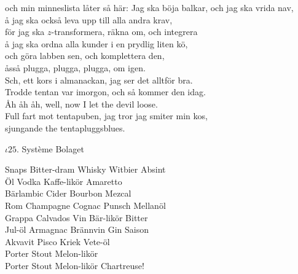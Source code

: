 \documentclass[a6paper, 10pt, twoside]{article}
\begin{document}
\begin{lyrics}
och min minneslista låter så här:
\newpage
\noindent
Jag ska böja balkar, och jag ska vrida nav, \\
å jag ska också leva upp till alla andra krav, \\
för jag ska $z$-transformera, räkna om, och integrera \\
å jag ska ordna alla kunder i en prydlig liten kö, \\
och göra labben sen, och komplettera den, \\
åsså plugga, plugga, plugga, om igen.
\vspace{5pt} \\
Sch, ett kors i almanackan, jag ser det alltför bra. \\
Trodde tentan var imorgon, och så kommer den idag. \\
Åh åh åh, well, now I let the devil loose. \\
Full fart mot tentapuben, jag tror jag smiter min kos, \\
sjungande the tentapluggsblues. 
\end{lyrics}

\begin{center}
    \Large $\iota25$. Système Bolaget\\
\end{center}
\begin{lyrics}
Snaps Bitter-dram Whisky Witbier Absint \\
Öl Vodka Kaffe-likör Amaretto \\
Bärlambic Cider Bourbon Mezcal \\
Rom Champagne Cognac Punsch Mellanöl
\vspace{5pt} \\
Grappa Calvados   Vin Bär-likör Bitter \\
Jul-öl Armagnac   Brännvin Gin Saison \\
Akvavit Pisco Kriek Vete-öl
\vspace{5pt} \\
Porter Stout Melon-likör   \\
Porter Stout Melon-likör Chartreuse!
\end{lyrics}
\end{document}
